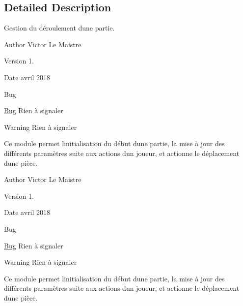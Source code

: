 \subsection{Detailed Description}
Gestion du déroulement d\textquotesingle{}une partie. 

\begin{DoxyAuthor}{Author}
Victor Le Maistre 
\end{DoxyAuthor}
\begin{DoxyVersion}{Version}
1. 
\end{DoxyVersion}
\begin{DoxyDate}{Date}
avril 2018 
\end{DoxyDate}
\begin{DoxyRefDesc}{Bug}
\item[\hyperlink{bug__bug000004}{Bug}]Rien à signaler \end{DoxyRefDesc}
\begin{DoxyWarning}{Warning}
Rien à signaler
\end{DoxyWarning}
Ce module permet l\textquotesingle{}initialisation du début d\textquotesingle{}une partie, la mise à jour des différents paramètres suite aux actions d\textquotesingle{}un joueur, et actionne le déplacement d\textquotesingle{}une pièce.

\begin{DoxyAuthor}{Author}
Victor Le Maistre 
\end{DoxyAuthor}
\begin{DoxyVersion}{Version}
1. 
\end{DoxyVersion}
\begin{DoxyDate}{Date}
avril 2018 
\end{DoxyDate}
\begin{DoxyRefDesc}{Bug}
\item[\hyperlink{bug__bug000005}{Bug}]Rien à signaler \end{DoxyRefDesc}
\begin{DoxyWarning}{Warning}
Rien à signaler
\end{DoxyWarning}
Ce module permet l\textquotesingle{}initialisation du début d\textquotesingle{}une partie, la mise à jour des différents paramètres suite aux actions d\textquotesingle{}un joueur, et actionne le déplacement d\textquotesingle{}une pièce.


